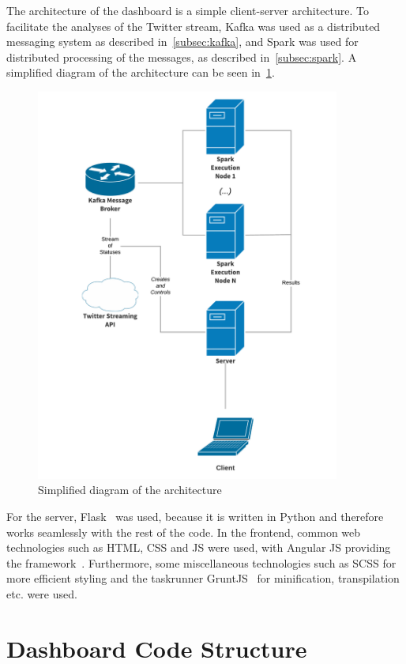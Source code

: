 The architecture of the dashboard is a simple client-server architecture.
To facilitate the analyses of the Twitter stream,
Kafka was used as a distributed messaging system as described in~\ref{subsec:kafka},
and Spark was used for distributed processing of the messages, as described in~\ref{subsec:spark}.
A simplified diagram of the architecture can be seen in~\ref{fig:architecture}.

\begin{figure}
    \centering
    \caption{Simplified diagram of the architecture}
    \label{fig:architecture}
    \includegraphics[width=10cm]{../figures/architecture.pdf}
\end{figure}

For the server, Flask~\cite{flaskDocs} was used, because it is written in Python and therefore works seamlessly with the rest of the code.
In the frontend, common web technologies such as HTML, CSS and JS were used, with Angular JS providing the framework~\cite{angularDocs}.
Furthermore, some miscellaneous technologies such as SCSS\cite{scssDocs} for more efficient styling and the taskrunner GruntJS~\cite{gruntDocs} for
minification, transpilation etc. were used.

\section{Dashboard Code Structure}
\label{sec:dashboardCodeStructure}

